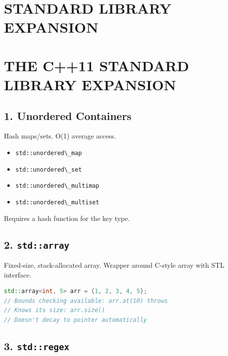 \hypertarget{standard-library-expansion}{%
\chapter{STANDARD LIBRARY EXPANSION}\label{standard-library-expansion}}

\hypertarget{the-c11-standard-library-expansion}{%
\chapter{THE C++11 STANDARD LIBRARY
EXPANSION}\label{the-c11-standard-library-expansion}}

\hypertarget{unordered-containers}{%
\section{1. Unordered Containers}\label{unordered-containers}}

Hash maps/sets. O(1) average access.

\begin{itemize}
\tightlist
\item
  \passthrough{\lstinline!std::unordered\_map!}
\item
  \passthrough{\lstinline!std::unordered\_set!}
\item
  \passthrough{\lstinline!std::unordered\_multimap!}
\item
  \passthrough{\lstinline!std::unordered\_multiset!}
\end{itemize}

Requires a hash function for the key type.

\hypertarget{stdarray}{%
\section{\texorpdfstring{2.
\texttt{std::array}}{2. std::array}}\label{stdarray}}

Fixed-size, stack-allocated array. Wrapper around C-style array with STL
interface.

\begin{lstlisting}[language={C++}]
std::array<int, 5> arr = {1, 2, 3, 4, 5};
// Bounds checking available: arr.at(10) throws
// Knows its size: arr.size()
// Doesn't decay to pointer automatically
\end{lstlisting}

\hypertarget{stdregex}{%
\section{\texorpdfstring{3.
\texttt{std::regex}}{3. std::regex}}\label{stdregex}}

